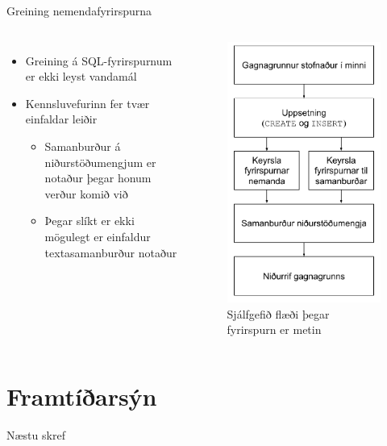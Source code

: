 \documentclass[hi-blar]{beamer}
\begin{document}
\begin{frame}{Greining nemendafyrirspurna}
    \begin{columns}
        \begin{itemize}
        \item Greining á SQL-fyrirspurnum er ekki leyst vandamál
        \item Kennsluvefurinn fer tvær einfaldar leiðir
        \begin{itemize}
            \item Samanburður á niðurstöðumengjum er notaður þegar honum verður komið við
            \item Þegar slíkt er ekki mögulegt er einfaldur textasamanburður notaður
        \end{itemize}
    \end{itemize}
    \begin{figure}
        \caption{Sjálfgefið flæði þegar fyrirspurn er metin}
        \includegraphics[width=0.8\linewidth]{keyrsla-fyrirspurnar-lodrett}
    \end{figure}
    \end{columns}
\end{frame}

\section{Framtíðarsýn}

\begin{frame}{Næstu skref}
    
\end{frame}
\end{document}
